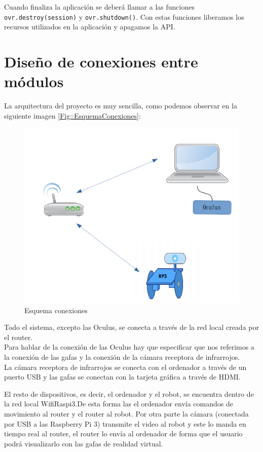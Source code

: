\documentclass[twoside, 11pt]{epstfg}
\begin{document}
Cuando finaliza la aplicación se deberá llamar a las funciones \texttt{ovr.destroy(session)} y \texttt{ovr.shutdown()}. Con estas funciones liberamos los recursos utilizados en la aplicación y apagamos la API.

\section{Diseño de conexiones entre módulos}

La arquitectura del proyecto es muy sencilla, como podemos observar en la siguiente imagen \ref{Fig::EsquemaConexiones}:

\begin{figure}[h]
	\centerline{
		\mbox{\includegraphics[width=.80\textwidth]{images/EsquemaConexiones.png}}
	}
	\caption{Esquema conexiones}
\end{figure}\label{Fig::EsquemaConexiones}


Todo el sistema, excepto las Oculus, se conecta a través de la red local creada por el router.\\
Para hablar de la conexión de las Oculus hay que especificar que nos referimos a la conexión de las gafas y la conexión de la cámara receptora de infrarrojos.\\
La cámara receptora de infrarrojos se conecta con el ordenador a través de un puerto USB y las gafas se conectan con la tarjeta gráfica a través de HDMI.

El resto de dispositivos, es decir, el ordenador y el robot, se encuentra dentro de la red local WifiRaspi3.De esta forma las el ordenador envía comandos de movimiento al router y el router al robot. Por otra parte la cámara (conectada por USB a las Raspberry Pi 3) transmite el video al robot y este lo manda en tiempo real al router, el router lo envía al ordenador de forma que el usuario podrá visualizarlo con las gafas de realidad virtual.
\end{document}
